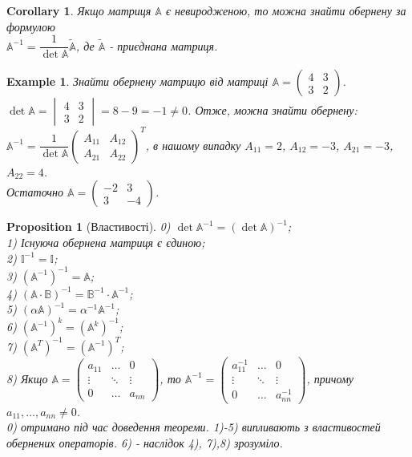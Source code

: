 \documentclass[a4paper, 10pt]{article}
\theoremstyle{theoremdd}
\newtheorem{example}[theorem]{Example}
\newtheorem{proposition}[theorem]{Proposition}
\newtheorem{corollary}[theorem]{Corollary}
\begin{document}
\begin{corollary}
Якщо матриця $\mathbb{A}$ є невиродженою, то можна знайти обернену за формулою \\ $\mathbb{A}^{-1} = \dfrac{1}{\det \mathbb{A}} \tilde{\mathbb{A}}$, де $\tilde{\mathbb{A}}$ - приєднана матриця.
\end{corollary}

\begin{example}
Знайти обернену матрицю від матриці $\mathbb{A} = \begin{pmatrix}
4 & 3 \\
3 & 2
\end{pmatrix}$.\\
$\det \mathbb{A} = \begin{vmatrix}
4 & 3 \\
3 & 2
\end{vmatrix} = 8-9 = -1 \neq 0$. Отже, можна знайти обернену:\\
$\mathbb{A}^{-1} = \dfrac{1}{\det \mathbb{A}} \begin{pmatrix}
A_{11} & A_{12} \\
A_{21} & A_{22}
\end{pmatrix}^T$, в нашому випадку $A_{11} = 2$, $A_{12} = -3$, $A_{21} = -3$, $A_{22}=4$.\\
Остаточно $\mathbb{A} = \begin{pmatrix}
-2 & 3 \\
3 & -4
\end{pmatrix}$.
\end{example}

\begin{proposition}[Властивості]
	0) $\det \mathbb{A}^{-1} = (\det \mathbb{A})^{-1}$;\\
	1) Існуюча обернена матриця є єдиною;\\
	2) $\mathbb{I}^{-1} = \mathbb{I}$;\\
	3) $(\mathbb{A}^{-1})^{-1} = \mathbb{A}$;\\
	4) $(\mathbb{A} \cdot \mathbb{B})^{-1} = \mathbb{B}^{-1} \cdot \mathbb{A}^{-1}$;\\
	5) $(\alpha \mathbb{A})^{-1} = \alpha^{-1} \mathbb{A}^{-1}$;\\
	6) $(\mathbb{A}^{-1})^k = (\mathbb{A}^k)^{-1}$;\\
	7) $(\mathbb{A}^T)^{-1} = (\mathbb{A}^{-1})^T$;\\
	8) Якщо $\mathbb{A} = \begin{pmatrix}
	a_{11} & \dots & 0 \\
	\vdots & \ddots & \vdots \\
	0 & \dots & a_{nn}
	\end{pmatrix}$, то $\mathbb{A}^{-1} = \begin{pmatrix}
	a_{11}^{-1} & \dots & 0 \\
	\vdots & \ddots & \vdots \\
	0 & \dots & a_{nn}^{-1}
	\end{pmatrix}$, причому $a_{11},\dots,a_{nn} \neq 0$.\\
	
	\textit{0) отримано під час доведення теореми. 1)-5) випливають з властивостей обернених операторів. 6) - наслідок 4), 7),8) зрозуміло.}
\end{proposition}
\end{document}
